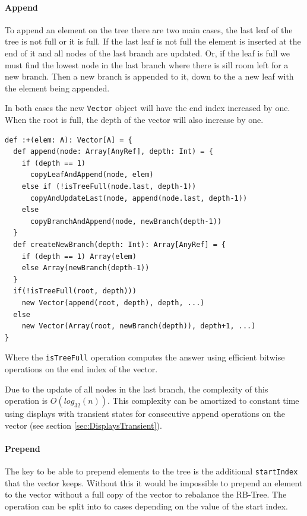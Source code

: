 \paragraph{Append}
To append an element on the tree there are two main cases, the last leaf of the tree is not full or it is full. If the last leaf is not full the element is inserted at the end of it and all nodes of the last branch are updated. Or, if the leaf is full we must find the lowest node in the last branch where there is sill room left for a new branch. Then a new branch is appended to it, down to the a new leaf with the element being appended. 

In both cases the new \texttt{Vector} object will have the end index increased by one. When the root is full, the depth of the vector will also increase by one.

\begin{lstlisting}[frame=single]
def :+(elem: A): Vector[A] = {
  def append(node: Array[AnyRef], depth: Int) = {
    if (depth == 1) 
      copyLeafAndAppend(node, elem)
    else if (!isTreeFull(node.last, depth-1)) 
      copyAndUpdateLast(node, append(node.last, depth-1))
    else
      copyBranchAndAppend(node, newBranch(depth-1))
  }
  def createNewBranch(depth: Int): Array[AnyRef] = {
    if (depth == 1) Array(elem)
    else Array(newBranch(depth-1))
  }
  if(!isTreeFull(root, depth))) 
    new Vector(append(root, depth), depth, ...)
  else 
    new Vector(Array(root, newBranch(depth)), depth+1, ...)
}
\end{lstlisting}

Where the \texttt{isTreeFull} operation computes the answer using efficient bitwise operations on the end index of the vector.

Due to the update of all nodes in the last branch, the complexity of this operation is $O(log_{32}(n))$. This complexity can be amortized to constant time using displays with transient states for consecutive append operations on the vector (see section \ref{sec:DisplaysTransient}).

\paragraph{Prepend}
The key to be able to prepend  elements to the tree is the additional \texttt{startIndex} that the vector keeps. Without this it would be impossible to prepend an element to the vector without a full copy of the vector to rebalance the RB-Tree. The operation can be split into to cases depending on the value of the start index.

